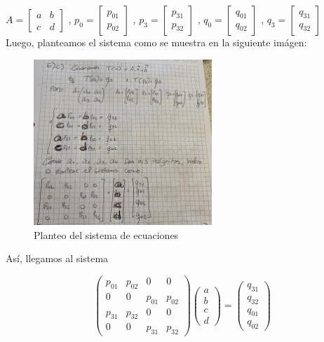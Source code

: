 \documentclass{article}
\begin{document}
$A =  
\begin{bmatrix}
a & b \\
c & d 
\end{bmatrix}$ ,  
$p_0 =  
\begin{bmatrix}
p_{01} \\
p_{02} 
\end{bmatrix}$ , 
$p_3 =  
\begin{bmatrix}
p_{31} \\
p_{32} 
\end{bmatrix}$ , 
$q_0 =  
\begin{bmatrix}
q_{01} \\
q_{02} 
\end{bmatrix}$ , 
$q_3 =  
\begin{bmatrix}
q_{31} \\
q_{32} 
\end{bmatrix}$ \\

Luego, planteamos el sistema como se muestra en la siguiente imágen:

\begin{figure}[H]
    \centering
    \includegraphics[width=0.6\textwidth]{imagenes/6c.jpg}
    \caption{Planteo del sistema de ecuaciones}
    \label{fig:ejemplo}
\end{figure}

Así, llegamos al sistema 

$$
\begin{pmatrix}
p_{01} & p_{02} & 0 & 0 \\
0 & 0 & p_{01} & p_{02} \\
p_{31} & p_{32} & 0 & 0 \\
0 & 0 & p_{31} & p_{32}
\end{pmatrix}
\begin{pmatrix}
a \\
b \\
c \\
d
\end{pmatrix}
=
\begin{pmatrix}
q_{31} \\
q_{32} \\
q_{01} \\
q_{02}
\end{pmatrix}
$$\\
\end{document}
